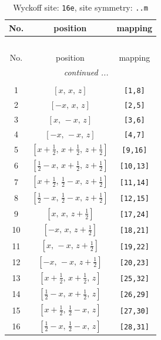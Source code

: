 \documentclass[fleqn,8pt]{jsarticle}
\begin{document}
\renewcommand{\arraystretch}{1.2}
\begin{longtable}{ccc}
\caption{Wyckoff site: {\tt 16e}, site symmetry: {\tt ..m}}
 \\
 \hline \hline
No. & position & mapping \\ \hline \endfirsthead

\multicolumn{2}{l}{\tablename\ \thetable{}} \\
 \hline \hline
No. & position & mapping \\ \hline \endhead

 \hline \hline
\multicolumn{2}{r}{\footnotesize\it continued ...} \\ \endfoot

 \hline \hline
\multicolumn{2}{r}{} \\ \endlastfoot

1 & $\left[ x,\, x,\, z \right]$ & {\tt [1,8]} \\ \hline
2 & $\left[ - x,\, x,\, z \right]$ & {\tt [2,5]} \\ \hline
3 & $\left[ x,\, - x,\, z \right]$ & {\tt [3,6]} \\ \hline
4 & $\left[ - x,\, - x,\, z \right]$ & {\tt [4,7]} \\ \hline
5 & $\left[ x + \frac{1}{2},\, x + \frac{1}{2},\, z + \frac{1}{2} \right]$ & {\tt [9,16]} \\ \hline
6 & $\left[ \frac{1}{2} - x,\, x + \frac{1}{2},\, z + \frac{1}{2} \right]$ & {\tt [10,13]} \\ \hline
7 & $\left[ x + \frac{1}{2},\, \frac{1}{2} - x,\, z + \frac{1}{2} \right]$ & {\tt [11,14]} \\ \hline
8 & $\left[ \frac{1}{2} - x,\, \frac{1}{2} - x,\, z + \frac{1}{2} \right]$ & {\tt [12,15]} \\ \hline
9 & $\left[ x,\, x,\, z + \frac{1}{2} \right]$ & {\tt [17,24]} \\ \hline
10 & $\left[ - x,\, x,\, z + \frac{1}{2} \right]$ & {\tt [18,21]} \\ \hline
11 & $\left[ x,\, - x,\, z + \frac{1}{2} \right]$ & {\tt [19,22]} \\ \hline
12 & $\left[ - x,\, - x,\, z + \frac{1}{2} \right]$ & {\tt [20,23]} \\ \hline
13 & $\left[ x + \frac{1}{2},\, x + \frac{1}{2},\, z \right]$ & {\tt [25,32]} \\ \hline
14 & $\left[ \frac{1}{2} - x,\, x + \frac{1}{2},\, z \right]$ & {\tt [26,29]} \\ \hline
15 & $\left[ x + \frac{1}{2},\, \frac{1}{2} - x,\, z \right]$ & {\tt [27,30]} \\ \hline
16 & $\left[ \frac{1}{2} - x,\, \frac{1}{2} - x,\, z \right]$ & {\tt [28,31]} \\
\end{longtable}
\end{document}
